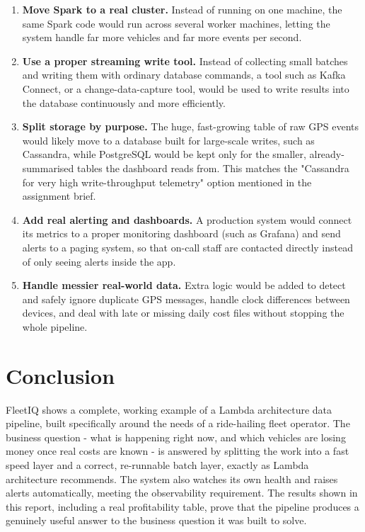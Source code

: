 \documentclass[12pt,a4paper]{article}
\begin{document}
\begin{enumerate}
  \item \textbf{Move Spark to a real cluster.} Instead of running on one
    machine, the same Spark code would run across several worker machines,
    letting the system handle far more vehicles and far more events per
    second.
  \item \textbf{Use a proper streaming write tool.} Instead of collecting
    small batches and writing them with ordinary database commands, a tool
    such as Kafka Connect, or a change-data-capture tool, would be used to
    write results into the database continuously and more efficiently.
  \item \textbf{Split storage by purpose.} The huge, fast-growing table of
    raw GPS events would likely move to a database built for large-scale
    writes, such as Cassandra, while PostgreSQL would be kept only for the
    smaller, already-summarised tables the dashboard reads from. This
    matches the "Cassandra for very high write-throughput telemetry"
    option mentioned in the assignment brief.
  \item \textbf{Add real alerting and dashboards.} A production system
    would connect its metrics to a proper monitoring dashboard (such as
    Grafana) and send alerts to a paging system, so that on-call staff are
    contacted directly instead of only seeing alerts inside the app.
  \item \textbf{Handle messier real-world data.} Extra logic would be added
    to detect and safely ignore duplicate GPS messages, handle clock
    differences between devices, and deal with late or missing daily cost
    files without stopping the whole pipeline.
\end{enumerate}

\section{Conclusion}

FleetIQ shows a complete, working example of a Lambda architecture data
pipeline, built specifically around the needs of a ride-hailing fleet
operator. The business question - what is happening right now, and which
vehicles are losing money once real costs are known - is answered by
splitting the work into a fast speed layer and a correct, re-runnable batch
layer, exactly as Lambda architecture recommends. The
system also watches its own health and raises alerts automatically,
meeting the observability requirement. The results shown in this report,
including a real profitability table, prove that the pipeline produces a
genuinely useful answer to the business question it was built to solve.
\end{document}
